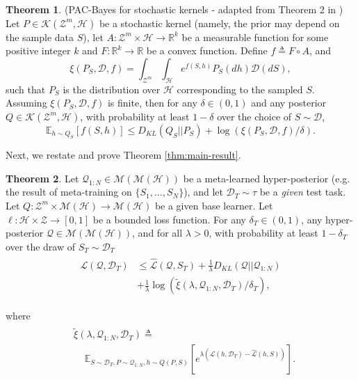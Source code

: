 \documentclass[letterpaper]{article} %
\theoremstyle{definition}
\newtheorem{theorem}{Theorem}[section]
\newcommand{\Expect}[2]{\mathbb{E}_{#1}\left [#2 \right ]}
\begin{document}
\begin{theorem} (PAC-Bayes for stochastic kernels - adapted from Theorem 2 in \citet{Rivasplata2020}) \label{thm:rivasplata-pb-appendix}
	Let $P\in \mathcal{K}(\mathcal{Z}^m, \mathcal{H})$ be a stochastic kernel (namely, the prior may depend on the sample data $S$), let $A: \mathcal{Z}^m\times \mathcal{H}\rightarrow \mathbb{R}^k$ be a measurable function for some positive integer $k$ and $F:\mathbb{R}^k\rightarrow \mathbb{R}$ be a convex function.
	Define $f\triangleq F\circ A$, and  
	$$
	\xi(P_S, \mathcal{D}, f)=\int_{\mathcal{Z}^m}\int_{\mathcal{H}}e^{f(S, h)}P_S(dh)\mathcal{D}(dS) , 
	$$
	such that $P_S$ is the distribution over $\mathcal{H}$ corresponding to the sampled $S$. Assuming $\xi(P_S, \mathcal{D}, f)$ is finite, then for any $\delta \in (0,1)$ and any posterior $Q\in \mathcal{K}(\mathcal{Z}^m, \mathcal{H})$, with probability at least $1-\delta$ over the choice of $S\sim \mathcal{D}$,
	\begin{equation} \label{eq:ribasplata-pb-appendix}
	\Expect{h\sim Q_S}{f(S, h)} \leq D_{KL}(Q_S||P_S)+\log\left (\xi(P_S, \mathcal{D}, f)/\delta\right ) .
	\end{equation}
\end{theorem}
%
Next, we restate and prove Theorem \ref{thm:main-result}. 
\begin{theorem} 
	Let $\mathcal{Q}_{1:N}\in \mathcal{M}(\mathcal{M}(\mathcal{H}))$ be a meta-learned hyper-posterior (e.g. the result of meta-training on $\{S_1,...,S_N\}$), and let $\mathcal{D}_T\sim \tau$ be a \emph{given} test task. Let $Q: \mathcal{Z}^m\times\mathcal{M}(\mathcal{H})\rightarrow \mathcal{M}(\mathcal{H})$ be a given base learner. Let $\ell: \mathcal{H}\times \mathcal{Z}\rightarrow [0, 1]$ be a bounded loss function.
	For any $\delta_T \in (0,1)$, any hyper-posterior $\mathcal{Q}\in \mathcal{M}(\mathcal{M}(\mathcal{H}))$, and for all $\lambda>0$, with probability at least $1-\delta_T$ over the draw of $S_T\sim \mathcal{D}_T$
%	
	\begin{align}
	\begin{split}
	\mathcal{L}(\mathcal{Q}, \mathcal{D}_T) &\leq \hat{\mathcal{L}}(\mathcal{Q}, S_T) + \frac{1}{\lambda}D_{KL}(\mathcal{Q}||\mathcal{Q}_{1:N})\\
	&+\frac{1}{\lambda}\log\left (\tilde{\xi}(\lambda,\mathcal{Q}_{1:N},\mathcal{D}_T)/\delta_T\right ) ,
	\end{split}
	\end{align}
	
	where 
	\begin{align} \label{eq:tilde_xi}
	\begin{split}
	&\tilde{\xi}(\lambda,\mathcal{Q}_{1:N},\mathcal{D}_T)\triangleq \\
	&\;\;\;\; \Expect{S\sim \mathcal{D}_T, P\sim \mathcal{Q}_{1:N}, h\sim Q(P,S)}{e^{\lambda\left (\mathcal{L}(h, \mathcal{D}_T)-\hat{\mathcal{L}}(h, S)\right )}} .
	\end{split}
	\end{align}
\end{theorem}
\end{document}
